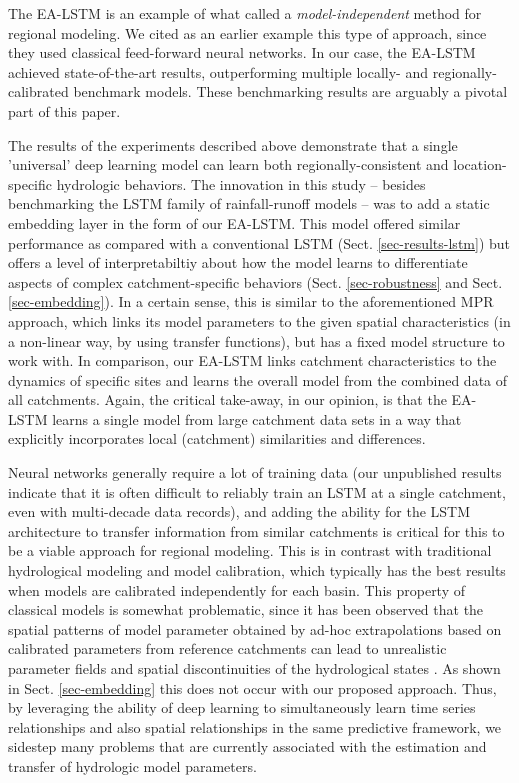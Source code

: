 \label{sec-discussion}
The \gls{EA-LSTM} is an example of what \citet{razavi2013streamflow} called a \textit{model-independent} method for regional modeling. We cited \citet{besaw2010advances} as an earlier example this type of approach, since they used classical feed-forward neural networks. In our case, the \gls{EA-LSTM} achieved state-of-the-art results, outperforming multiple locally- and regionally-calibrated benchmark models. These benchmarking results are arguably a pivotal part of this paper. 

The results of the experiments described above demonstrate that a single 'universal' deep learning model can learn both regionally-consistent and location-specific hydrologic behaviors. The innovation in this study -- besides benchmarking the \gls{LSTM} family of rainfall-runoff models -- was to add a static embedding layer in the form of our \gls{EA-LSTM}. 
This model offered similar performance as compared with a conventional \gls{LSTM} (Sect. \ref{sec-results-lstm}) but offers a level of interpretabiltiy about how the model learns to differentiate aspects of complex catchment-specific behaviors (Sect. \ref{sec-robustness} and Sect. \ref{sec-embedding}). 
In a certain sense, this is similar to the aforementioned \gls{MPR} approach, which links its model parameters to the given spatial characteristics (in a non-linear way, by using transfer functions), but has a fixed model structure to work with. In comparison, our \gls{EA-LSTM} links catchment characteristics to the dynamics of specific sites and learns the overall model from the combined data of all catchments. Again, the critical take-away, in our opinion, is that the \gls{EA-LSTM} learns a single model from large catchment data sets in a way that explicitly incorporates local (catchment) similarities and differences. 

Neural networks generally require a lot of training data (our unpublished results indicate that it is often difficult to reliably train an \gls{LSTM} at a single catchment, even with multi-decade data records), and adding the ability for the \gls{LSTM} architecture to transfer information from similar catchments is critical for this to be a viable approach for regional modeling. This is in contrast with traditional hydrological modeling and model calibration, which typically has the best results when models are calibrated independently for each basin. This property of classical models is somewhat problematic, since it has been observed that the spatial patterns of model parameter obtained by ad-hoc extrapolations based on calibrated parameters from reference catchments can lead to unrealistic parameter fields and spatial discontinuities of the hydrological states \citep{mizukami2017towards}. As shown in Sect. \ref{sec-embedding} this does not occur with our proposed approach. Thus, by leveraging the ability of deep learning to simultaneously learn time series relationships and also spatial relationships in the same predictive framework, we sidestep many problems that are currently associated with the estimation and transfer of hydrologic model parameters. 

